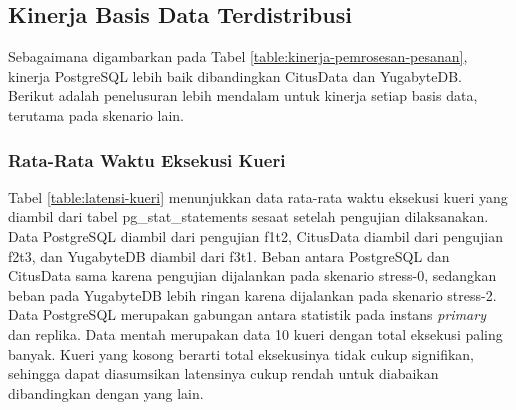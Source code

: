 \subsection{Kinerja Basis Data Terdistribusi}

Sebagaimana digambarkan pada Tabel \ref{table:kinerja-pemrosesan-pesanan}, kinerja PostgreSQL lebih baik dibandingkan CitusData dan YugabyteDB. Berikut adalah penelusuran lebih mendalam untuk kinerja setiap basis data, terutama pada skenario lain.

\subsubsection{Rata-Rata Waktu Eksekusi Kueri}

Tabel \ref{table:latensi-kueri} menunjukkan data rata-rata waktu eksekusi kueri yang diambil dari tabel pg\_stat\_statements sesaat setelah pengujian dilaksanakan. Data PostgreSQL diambil dari pengujian f1t2, CitusData diambil dari pengujian f2t3, dan YugabyteDB diambil dari f3t1. Beban antara PostgreSQL dan CitusData sama karena pengujian dijalankan pada skenario stress-0, sedangkan beban pada YugabyteDB lebih ringan karena dijalankan pada skenario stress-2. Data PostgreSQL merupakan gabungan antara statistik pada instans \textit{primary} dan replika. Data mentah merupakan data 10 kueri dengan total eksekusi paling banyak. Kueri yang kosong berarti total eksekusinya tidak cukup signifikan, sehingga dapat diasumsikan latensinya cukup rendah untuk diabaikan dibandingkan dengan yang lain.

